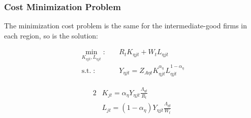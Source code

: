 \documentclass[
	12pt,
	]{article}
\numberwithin{equation}{section}
\DeclareMathOperator{\st}{s.t.}
\theoremstyle{definition}
\theoremstyle{plain}
\theoremstyle{plain}
\theoremstyle{plain}
\begin{document}
\subsubsection*{Cost Minimization Problem}

The minimization cost problem is the same for the intermediate-good firms in each region, so is the solution:

\begin{align}
	\label{eq:int-good-firm-total-cost}
	\min_{K_{\eta jt}, L_{\eta jt}}: \quad & R_t K_{\eta jt} + W_t L_{\eta jt} \\
	\label{eq:int-good-firm-production-function}
	\st: \quad & Y_{\eta jt} = Z_{A\eta t} K_{\eta jt}^{\alpha_\eta} L_{\eta jt}^{1 -{\alpha_\eta}}
\end{align}


%
%
%
%
\begin{alignat}{2}
	& K_{jt} = {\alpha_\eta} Y_{\eta jt} \frac{\Lambda_{\eta t}}{R_t} \label{eq:int-good-firm-FOC-Kt} \\
	& L_{jt} = (1-{\alpha_\eta}) Y_{\eta jt} \frac{\Lambda_{\eta t}}{W_t} \label{eq:int-good-firm-FOC-Lt} \\
\end{alignat}
\end{document}
